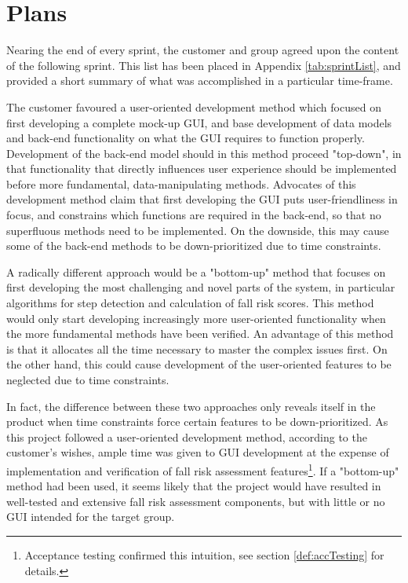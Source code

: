 
\section{Plans}	

Nearing the end of every sprint, the customer and group agreed upon the content of the following sprint. This list has been placed in Appendix \ref{tab:sprintList}, and provided a short summary of what was accomplished in a particular time-frame. 

The customer favoured a user-oriented development method which focused on first developing a complete mock-up GUI, and base development of data models and back-end functionality on what the GUI requires to function properly. Development of the back-end model should in this method proceed "top-down", in that functionality that directly influences user experience should be implemented before more fundamental, data-manipulating methods. Advocates of this development method claim that first developing the GUI puts user-friendliness in focus, and constrains which functions are required in the back-end, so that no superfluous methods need to be implemented. On the downside, this may cause some of the back-end methods to be down-prioritized due to time constraints.

A radically different approach would be a "bottom-up" method that focuses on first developing the most challenging and novel parts of the system, in particular algorithms for step detection and calculation of fall risk scores. This method would only start developing increasingly more user-oriented functionality when the more fundamental methods have been verified. An advantage of this method is that it allocates all the time necessary to master the complex issues first. On the other hand, this could cause development of the user-oriented features to be neglected due to time constraints. 

In fact, the difference between these two approaches only reveals itself in the product when time constraints force certain features to be down-prioritized. As this project followed a user-oriented development method, according to the customer's wishes, ample time was given to GUI development at the expense of implementation and verification of fall risk assessment features\footnote{Acceptance testing confirmed this intuition, see section \ref{def:accTesting} for details.}. If a "bottom-up" method had been used, it seems likely that the project would have resulted in well-tested and extensive fall risk assessment components, but with little or no GUI intended for the target group. 


